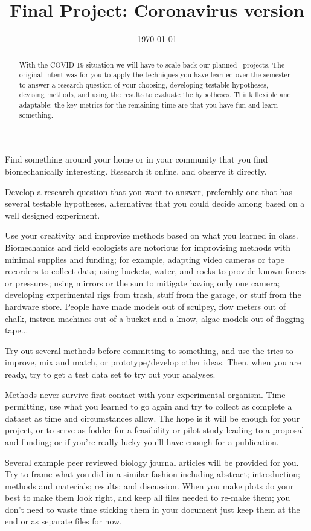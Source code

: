 \documentclass{exam}
\title{Final Project: Coronavirus version}
\author{\usnaInstructorShort}
\date{\today}
\begin{document}
\maketitle
\begin{abstract}
With the COVID-19 situation we will have to scale back our planned \usnaCourseNumber\ projects. The original intent was for you to apply the techniques you have learned over the semester to answer a research question of your choosing, developing testable hypotheses, devising methods, and using the results to evaluate the hypotheses. Think flexible and adaptable; the key metrics for the remaining time are that you have fun and learn something. 
\end{abstract}

\begin{questions}
\question Find something around your home or in your community that you find biomechanically interesting. Research it online, and observe it directly.  

\question Develop a research question that you want to answer, preferably one that has several testable hypotheses, alternatives that you could decide among based on a well designed experiment. 

\question Use your creativity and improvise methods based on what you learned in class. Biomechanics and field ecologists are notorious for improvising methods with minimal supplies and funding; for example, adapting video cameras or tape recorders to collect data; using buckets, water, and rocks to provide known forces or pressures; using mirrors or the sun to mitigate having only one camera; developing experimental rigs from trash, stuff from the garage, or stuff from the hardware store. People have made models out of sculpey, flow meters out of chalk, instron machines out of a bucket and a know, algae models out of flagging tape... 

\question Try out several methods before committing to something, and use the tries to improve, mix and match, or prototype/develop other ideas. Then, when you are ready, try to get a test data set to try out your analyses. 

\question Methods never survive first contact with your experimental organism. Time permitting, use what you learned to go again and try to collect as complete a dataset as time and circumstances allow. The hope is it will be enough for your project, or to serve as fodder for a feasibility or pilot study leading to a proposal and funding; or if you're really lucky you'll have enough for a publication. 

\question Several example peer reviewed biology journal articles will be provided for you. Try to frame what you did in a similar fashion including abstract; introduction; methods and materials; results; and discussion. When you make plots do your best to make them look right, and keep all files needed to re-make them; you don't need to waste time sticking them in your document just keep them at the end or as separate files for now. 
\end{questions}
\end{document}
